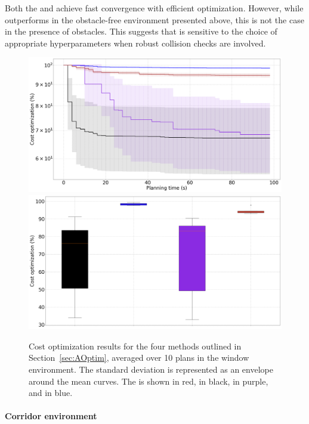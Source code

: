 Both the  and  achieve fast convergence with efficient optimization. 
However, while  outperforms  in the obstacle-free environment presented above, this is not the case in the presence of obstacles. 
This suggests that  is sensitive to the choice of appropriate hyperparameters when robust collision checks are involved.

\begin{figure} [htp]
    \centering
    \includegraphics[width=0.9\linewidth]{figures/accuracy/all_methods_window.png} \\
    \includegraphics[width=0.9\linewidth]{figures/accuracy/bplot_all_methods_window.png}
    \caption{Cost optimization results for the four methods outlined in Section~\ref{sec:AOptim}, averaged over 10 plans in the window environment. 
    The standard deviation is represented as an envelope around the mean curves.
    The  is shown in red,  in black,  in purple, and  in blue.}%
    \label{fig:acc_window}%
\end{figure}

\paragraph{Corridor environment}

